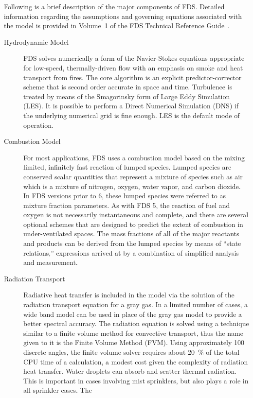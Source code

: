 \documentclass[11pt]{book}
\begin{document}
Following is a brief description of the major components of FDS. Detailed information regarding the assumptions and governing equations associated
with the model is provided in Volume~1 of the FDS Technical Reference Guide~\cite{FDS_Tech_Guide}.
\begin{description}
\item[Hydrodynamic Model] FDS
solves numerically a form of the Navier-Stokes equations appropriate for low-speed, thermally-driven flow with an emphasis on smoke and heat
transport from fires. The core algorithm is an explicit predictor-corrector scheme that is second order accurate in space and time. Turbulence is
treated by means of the Smagorinsky form of Large Eddy Simulation (LES). It is possible to perform a Direct Numerical Simulation (DNS) if the
underlying numerical grid is fine enough. LES is the default mode of operation.
\item[Combustion Model]
For most applications, FDS uses a combustion model based on the mixing limited, infinitely fast reaction of lumped species. Lumped species are
conserved scalar quantities that represent a mixture of species such as air which is a mixture of nitrogen, oxygen, water vapor, and carbon dioxide.
In FDS versions prior to 6, these lumped species were referred to as mixture fraction parameters.  As with FDS 5, the reaction of fuel and oxygen is
not necessarily instantaneous and complete, and there are several optional schemes that are designed to predict the extent of combustion in
under-ventilated spaces. The mass fractions of all of the major reactants and products can be derived from the lumped species by means of ``state
relations,'' expressions arrived at by a combination of simplified analysis and measurement.
\item[Radiation Transport] Radiative heat transfer is included in the
model via the solution of the radiation transport equation for a gray gas. In a limited number of cases, a wide band model can be used in place of
the gray gas model to provide a better spectral accuracy. The radiation equation is solved using a technique similar to a finite volume method for
convective transport, thus the name given to it is the Finite Volume Method (FVM). Using approximately 100 discrete angles, the finite volume solver
requires about 20~\% of the total CPU time of a calculation, a modest cost given the complexity of radiation heat transfer.  Water droplets can
absorb and scatter thermal radiation. This is important in cases involving mist sprinklers, but also plays a role in all sprinkler cases. The

\end{description}
\end{document}
